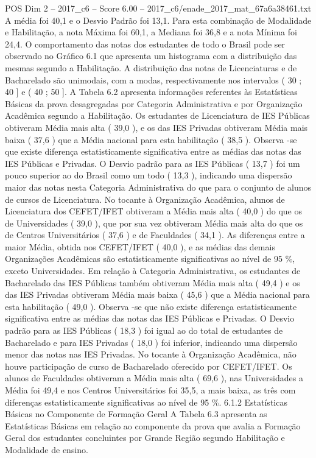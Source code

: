 \begin{textsample}{POS Dim 2 – 2017\_c6 – Score 6.00 – 2017\_c6/enade\_2017\_mat\_67a6a38461.txt}
A média foi 40,1 e o Desvio Padrão foi 13,1.
Para esta combinação de Modalidade e Habilitação, a nota Máxima foi 60,1, a Mediana foi 36,8 e a nota Mínima foi 24,4.
O comportamento das notas dos estudantes de todo o Brasil pode ser observado no Gráfico 6.1 que apresenta um histograma com a distribuição das mesmas segundo a Habilitação.
A distribuição das notas de Licenciaturas e de Bacharelado são unimodais, com a modas, respectivamente nos intervalos ( 30 ; 40 ] e ( 40 ; 50 ].
A Tabela 6.2 apresenta informações referentes às Estatísticas Básicas da prova desagregadas por Categoria Administrativa e por Organização Acadêmica segundo a Habilitação.
Os estudantes de Licenciatura de IES Públicas obtiveram Média mais alta ( 39,0 ), e os das IES Privadas obtiveram Média mais baixa ( 37,6 ) que a Média nacional para esta habilitação ( 38,5 ).
Observa -se que existe diferença estatisticamente significativa entre as médias das notas das IES Públicas e Privadas.
O Desvio padrão para as IES Públicas ( 13,7 ) foi um pouco superior ao do Brasil como um todo ( 13,3 ), indicando uma dispersão maior das notas nesta Categoria Administrativa do que para o conjunto de alunos de cursos de Licenciatura.
No tocante à Organização Acadêmica, alunos de Licenciatura dos CEFET/IFET obtiveram a Média mais alta ( 40,0 ) do que os de Universidades ( 39,0 ), que por sua vez obtiveram Média mais alta do que os de Centros Universitários ( 37,6 ) e de Faculdades ( 34,1 ).
As diferenças entre a maior Média, obtida nos CEFET/IFET ( 40,0 ), e as médias das demais Organizações Acadêmicas são estatisticamente significativas ao nível de 95 \%, exceto Universidades.
Em relação à Categoria Administrativa, os estudantes de Bacharelado das IES Públicas também obtiveram Média mais alta ( 49,4 ) e os das IES Privadas obtiveram Média mais baixa ( 45,6 ) que a Média nacional para esta habilitação ( 49,0 ).
Observa -se que não existe diferença estatisticamente significativa entre as médias das notas das IES Públicas e Privadas.
O Desvio padrão para as IES Públicas ( 18,3 ) foi igual ao do total de estudantes de Bacharelado e para IES Privadas ( 18,0 ) foi inferior, indicando uma dispersão menor das notas nas IES Privadas.
No tocante à Organização Acadêmica, não houve participação de curso de Bacharelado oferecido por CEFET/IFET.
Os alunos de Faculdades obtiveram a Média mais alta ( 69,6 ), nas Universidades a Média foi 49,4 e nos Centros Universitários foi 35,5, a mais baixa, as três com diferenças estatisticamente significativas ao nível de 95 \%. 6.1.2 Estatísticas Básicas no Componente de Formação Geral A Tabela 6.3 apresenta as Estatísticas Básicas em relação ao componente da prova que avalia a Formação Geral dos estudantes concluintes por Grande Região segundo Habilitação e Modalidade de ensino.

\end{textsample}
